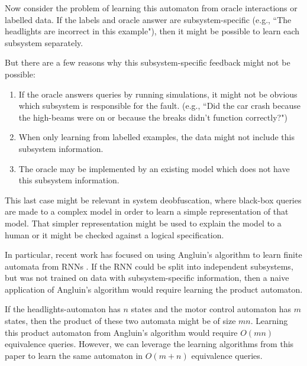 


Now consider the problem of learning this automaton from oracle interactions or labelled data. 
If the labels and oracle answer are subsystem-specific (e.g.,  ``The headlights are incorrect in this example"), then it might be possible to learn each subsystem separately.

But there are a few reasons why this subsystem-specific feedback might not be possible:
\begin{enumerate}
\item If the oracle answers queries by running simulations, it might not be obvious which subsystem is responsible for the fault.
(e.g., ``Did the car crash because the high-beams were on or because the breaks didn't function correctly?")
\item When only learning from labelled examples, the data might not include this subsystem information. 
\item The oracle may be implemented by an existing model which does not have this subsystem information.
\end{enumerate}


This last case might be relevant in system deobfuscation, where black-box queries are made to a complex model in order to learn a simple representation of that model. 
That simpler representation might be used to explain the model to a human or it might be checked against a logical specification. 

In particular, recent work has focused on using Angluin's algorithm to learn finite automata from RNNs \cite{weiss2017extracting}.  
If the RNN could be split into independent subsystems, but was not trained on data with subsystem-specific information, then a naive application of Angluin's algorithm would require learning the product automaton.

If the headlights-automaton has $n$ states and the motor control automaton has $m$ states, then the product of these two automata might be of size $mn$.  
Learning this product automaton from Angluin's algorithm would require $O(mn)$ equivalence queries.
However,  we can leverage the learning algorithms from this paper to learn the same automaton in $O(m+n)$ equivalence queries. 




%
%
%
%
%
%
%
%







